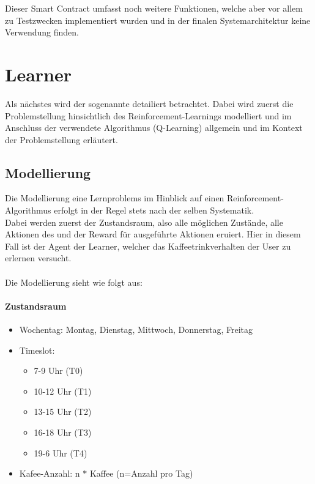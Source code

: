 Dieser Smart Contract umfasst noch weitere Funktionen, welche aber vor allem zu Testzwecken implementiert wurden und in der finalen Systemarchitektur keine Verwendung finden. 


\section{Learner}
\label{sec:ql}
Als nächstes wird der sogenannte  detailiert betrachtet. Dabei wird zuerst die Problemstellung hinsichtlich des Reinforcement-Learnings modelliert und im Anschluss der verwendete Algorithmus (Q-Learning) allgemein und im Kontext der Problemstellung erläutert. \\

\subsection{Modellierung}
\label{subsec:modulation}
Die Modellierung eine Lernproblems im Hinblick auf einen Reinforcement-Algorithmus erfolgt in der Regel stets nach der selben Systematik. \\
Dabei werden zuerst der Zustandsraum, also alle möglichen Zustände, alle Aktionen des  und der Reward für ausgeführte Aktionen eruiert.
Hier in diesem Fall ist der Agent der Learner, welcher das Kaffeetrinkverhalten der User zu erlernen versucht.\\\\
Die Modellierung sieht wie folgt aus: 
\paragraph{Zustandsraum}
\begin{itemize}
	\item Wochentag: Montag, Dienstag, Mittwoch, Donnerstag, Freitag
	\item Timeslot:
	      \begin{itemize}
	      	\item 7-9 Uhr (T0)
	      	\item 10-12 Uhr (T1)
	      	\item 13-15 Uhr (T2)
	      	\item 16-18 Uhr (T3)
	      	\item 19-6 Uhr (T4)
	      \end{itemize} 
	\item Kafee-Anzahl: n $*$ Kaffee (n=Anzahl pro Tag)
\end{itemize}

